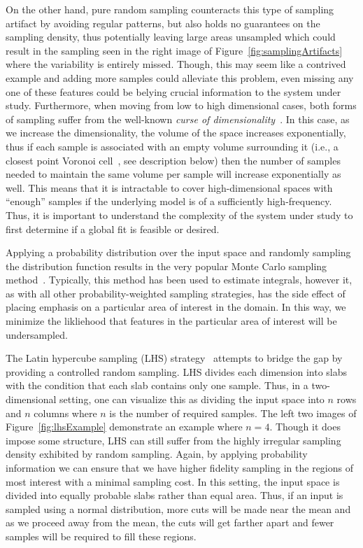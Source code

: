 On the other hand, pure random sampling counteracts this type of sampling artifact by avoiding regular patterns, but also holds no guarantees on the sampling density, thus potentially leaving large areas unsampled which could result in the sampling seen in the right image of Figure~\ref{fig:samplingArtifacts} where the variability is entirely missed.
%
Though, this may seem like a contrived example and adding more samples could alleviate this problem, even missing any one of these features could be belying crucial information to the system under study.
%
Furthermore, when moving from low to high dimensional cases, both forms of sampling suffer from the well-known \emph{curse of dimensionality}~\cite{KeoghMueen2010}.
%
In this case, as we increase the dimensionality, the volume of the space increases exponentially, thus if each sample is associated with an empty volume surrounding it (i.e., a closest point Voronoi cell~\cite{deBergCheongKreveld2008}, see description below) then the number of samples needed to maintain the same volume per sample will increase exponentially as well.
%
This means that it is intractable to cover high-dimensional spaces with ``enough'' samples if the underlying model is of a sufficiently high-frequency.
%
Thus, it is important to understand the complexity of the system under study to first determine if a global fit is feasible or desired.

Applying a probability distribution over the input space and randomly sampling the distribution function results in the very popular Monte Carlo sampling method~\cite{MetropolisUlam1949}.
%
Typically, this method has been used to estimate integrals, however it, as with all other probability-weighted sampling strategies, has the side effect of placing emphasis on a particular area of interest in the domain.
%
In this way, we minimize the likliehood that features in the particular area of interest will be undersampled.

The Latin hypercube sampling (LHS) strategy~\cite{McKayBeckmanConover1979,Tang1993,VanDam2008} attempts to bridge the gap by providing a controlled random sampling.
%
LHS divides each dimension into slabs with the condition that each slab contains only one sample.
%
Thus, in a two-dimensional setting, one can visualize this as dividing the input space into $n$ rows and $n$ columns where $n$ is the number of required samples.
%
The left two images of Figure~\ref{fig:lhsExample} demonstrate an example where $n=4$.
%
Though it does impose some structure, LHS can still suffer from the highly irregular sampling density exhibited by random sampling.
%
Again, by applying probability information we can ensure that we have higher fidelity sampling in the regions of most interest with a minimal sampling cost.
%
In this setting, the input space is divided into equally probable slabs rather than equal area.
%
Thus, if an input is sampled using a normal distribution, more cuts will be made near the mean and as we proceed away from the mean, the cuts will get farther apart and fewer samples will be required to fill these regions.


